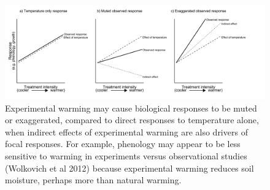 \documentclass{article}
\begin{document}
 \begin{figure}[p]
     \centering
 \includegraphics{figures/DirIndWarmingEffects.pdf}    
 \caption{Experimental warming may cause biological responses to be muted or exaggerated, compared to direct responses to temperature alone, when indirect effects of experimental warming are also drivers of focal responses. For example, phenology may appear to be less sensitive to warming in experiments versus observational studies (Wolkovich et al 2012) because experimental warming reduces soil moisture, perhaps more than natural warming.}
 \end{figure}
\end{document}
